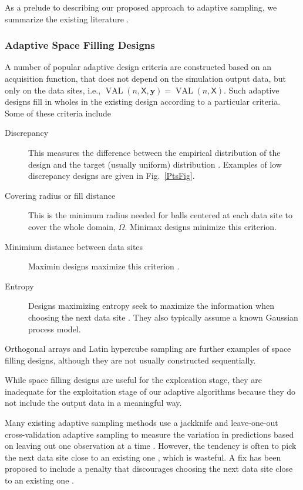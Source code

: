 \documentclass[11pt]{NSFamsart}
\DeclareMathOperator{\VAL}{VAL}
\newcommand{\mX}{\mathsf{X}}
\newcommand{\by}{{\boldsymbol{y}}}
\begin{document}
As a prelude to describing our proposed approach to adaptive sampling, we summarize the existing literature \cite{aute2013cross,burnaev2015adaptive,fu2017adaptive,gramacy2008adaptive,jin2002sequential,kleijnen2004application}.

\subsubsection{Adaptive Space Filling Designs}
A number of popular adaptive design criteria are constructed based on an acquisition function, that does not depend on the simulation output data, but only on the data sites, i.e., $\VAL(n,\mX,\by) = \VAL(n,\mX)$.  Such adaptive designs fill in wholes in the existing design according to a particular criteria.  Some of these criteria include 
\begin{description}
    \item[Discrepancy] This measures the difference between the empirical distribution of the design and the target (usually uniform) distribution \cite{FangEtal19a}.  Examples of low discrepancy designs are given in Fig.\ \ref{PtsFig}.  
    \item[Covering radius or fill distance] This is the minimum radius needed for balls centered at each data site to cover the whole domain, $\Omega$.  Minimax designs minimize this criterion.
    \item[Minimium distance between data sites]  Maximin designs maximize this criterion \cite{jin2002sequential}.
    \item[Entropy] Designs maximizing entropy seek to maximize the information when choosing the next data site \cite{jin2002sequential}.  They also typically assume a known Gaussian process model.
\end{description}
Orthogonal arrays and Latin hypercube sampling are further examples of space filling designs, although they are not usually constructed sequentially.  

While space filling designs are useful for the exploration stage, they are inadequate for the exploitation stage of our adaptive algorithms because they do not include the output data in a meaningful way.  


Many existing adaptive sampling methods use a jackknife and leave-one-out cross-validation adaptive sampling to measure the variation in predictions based on leaving out one observation at a time \cite{aute2013cross,jin2002sequential, kleijnen2004application}.  However, the tendency is often to pick the next data site close to an existing one \cite{jin2002sequential}, which is wasteful.  A fix has been proposed to include a penalty that discourages choosing the next data site close to an existing one \cite{aute2013cross,jin2002sequential}.
\end{document}

